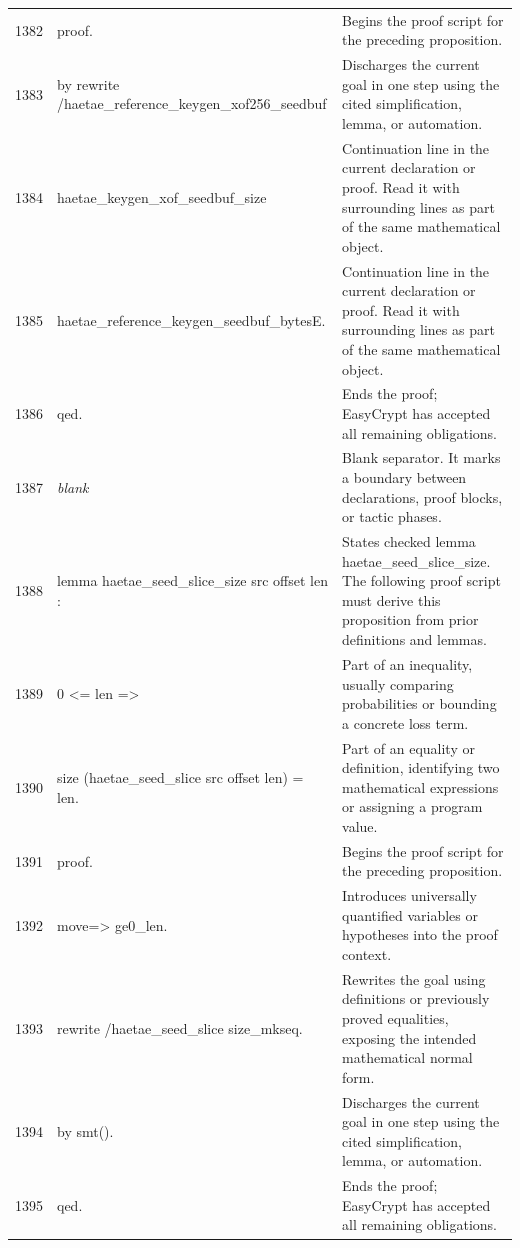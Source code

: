 \documentclass[10pt]{article}
\begin{document}
\begin{longtable}{r L{0.53\textwidth} L{0.37\textwidth}}
1382 & {\ttfamily\scriptsize proof.} & Begins the proof script for the preceding proposition. \\
1383 & {\ttfamily\scriptsize by rewrite /haetae\_reference\_keygen\_xof256\_seedbuf} & Discharges the current goal in one step using the cited simplification, lemma, or automation. \\
1384 & {\ttfamily\scriptsize            haetae\_keygen\_xof\_seedbuf\_size} & Continuation line in the current declaration or proof.  Read it with surrounding lines as part of the same mathematical object. \\
1385 & {\ttfamily\scriptsize            haetae\_reference\_keygen\_seedbuf\_bytesE.} & Continuation line in the current declaration or proof.  Read it with surrounding lines as part of the same mathematical object. \\
1386 & {\ttfamily\scriptsize qed.} & Ends the proof; EasyCrypt has accepted all remaining obligations. \\
1387 & {\ttfamily\scriptsize \emph{blank}} & Blank separator.  It marks a boundary between declarations, proof blocks, or tactic phases. \\
1388 & {\ttfamily\scriptsize lemma haetae\_seed\_slice\_size src offset len :} & States checked lemma haetae\_seed\_slice\_size.  The following proof script must derive this proposition from prior definitions and lemmas. \\
1389 & {\ttfamily\scriptsize   0 <= len =>} & Part of an inequality, usually comparing probabilities or bounding a concrete loss term. \\
1390 & {\ttfamily\scriptsize   size (haetae\_seed\_slice src offset len) = len.} & Part of an equality or definition, identifying two mathematical expressions or assigning a program value. \\
1391 & {\ttfamily\scriptsize proof.} & Begins the proof script for the preceding proposition. \\
1392 & {\ttfamily\scriptsize move=> ge0\_len.} & Introduces universally quantified variables or hypotheses into the proof context. \\
1393 & {\ttfamily\scriptsize rewrite /haetae\_seed\_slice size\_mkseq.} & Rewrites the goal using definitions or previously proved equalities, exposing the intended mathematical normal form. \\
1394 & {\ttfamily\scriptsize by smt().} & Discharges the current goal in one step using the cited simplification, lemma, or automation. \\
1395 & {\ttfamily\scriptsize qed.} & Ends the proof; EasyCrypt has accepted all remaining obligations. \\

\end{longtable}
\end{document}
